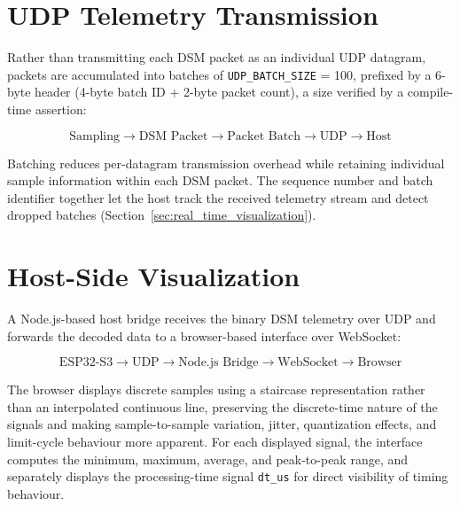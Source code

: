 
\section{UDP Telemetry Transmission}
\label{sec:udp_telemetry}

Rather than transmitting each DSM packet as an individual UDP datagram, packets
are accumulated into batches of \texttt{UDP\_BATCH\_SIZE} = 100, prefixed by a
6-byte header (4-byte batch ID + 2-byte packet count), a size verified by a
compile-time assertion:

\begin{equation}
    \boxed{
        \text{Sampling}
        \rightarrow
        \text{DSM Packet}
        \rightarrow
        \text{Packet Batch}
        \rightarrow
        \text{UDP}
        \rightarrow
        \text{Host}
    }
    \label{eq:batch_sequence}
\end{equation}

Batching reduces per-datagram transmission overhead while retaining individual
sample information within each DSM packet. The sequence number and batch
identifier together let the host track the received telemetry stream and detect
dropped batches (Section~\ref{sec:real_time_visualization}).


\section{Host-Side Visualization}
\label{sec:host_visualization}

A Node.js-based host bridge receives the binary DSM telemetry over UDP and
forwards the decoded data to a browser-based interface over WebSocket:

\begin{equation}
    \boxed{
        \text{ESP32-S3}
        \rightarrow
        \text{UDP}
        \rightarrow
        \text{Node.js Bridge}
        \rightarrow
        \text{WebSocket}
        \rightarrow
        \text{Browser}
    }
    \label{eq:host_path}
\end{equation}

The browser displays discrete samples using a staircase representation rather
than an interpolated continuous line, preserving the discrete-time nature of
the signals and making sample-to-sample variation, jitter, quantization
effects, and limit-cycle behaviour more apparent. For each displayed signal,
the interface computes the minimum, maximum, average, and peak-to-peak range,
and separately displays the processing-time signal \texttt{dt\_us} for direct
visibility of timing behaviour.

